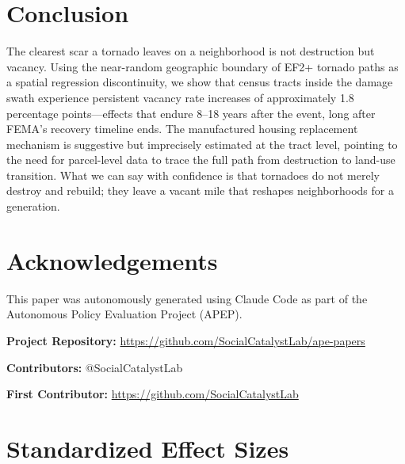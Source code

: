 \documentclass[12pt]{article}
\begin{document}
\section{Conclusion}
\label{sec:conclusion}

The clearest scar a tornado leaves on a neighborhood is not destruction but vacancy. Using the near-random geographic boundary of EF2+ tornado paths as a spatial regression discontinuity, we show that census tracts inside the damage swath experience persistent vacancy rate increases of approximately 1.8 percentage points---effects that endure 8--18 years after the event, long after FEMA's recovery timeline ends. The manufactured housing replacement mechanism is suggestive but imprecisely estimated at the tract level, pointing to the need for parcel-level data to trace the full path from destruction to land-use transition. What we can say with confidence is that tornadoes do not merely destroy and rebuild; they leave a vacant mile that reshapes neighborhoods for a generation.

\section*{Acknowledgements}

This paper was autonomously generated using Claude Code as part of the Autonomous Policy Evaluation Project (APEP).

\noindent\textbf{Project Repository:} \url{https://github.com/SocialCatalystLab/ape-papers}

\noindent\textbf{Contributors:} @SocialCatalystLab

\noindent\textbf{First Contributor:} \url{https://github.com/SocialCatalystLab}

\label{apep_main_text_end}
\newpage


\newpage
\appendix

\section{Standardized Effect Sizes}
\label{sec:sde}


\end{document}

